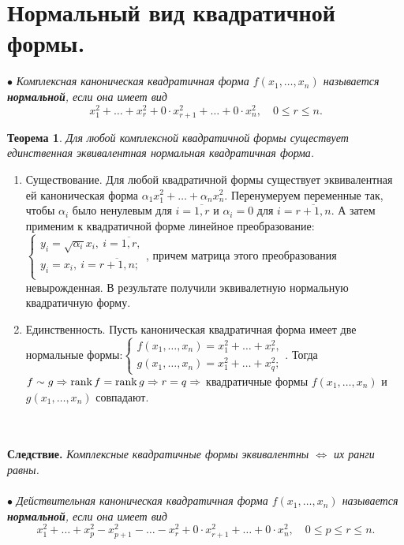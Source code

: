 \section{Нормальный вид квадратичной формы.}
$\bullet$ \textit{Комплексная каноническая квадратичная форма $f(x_1,\dots,x_n)$ называется \textbf{нормальной}, если она имеет вид}
$$x_1^2+ \ldots +x_r^2+0\cdot x_{r+1}^2+ \ldots +0\cdot x_n^2,\quad 0\leqslant r\leqslant n.$$
\newtheorem*{th13_4_1}{Теорема}\begin{th13_4_1}Для любой комплексной квадратичной формы существует единственная эквивалентная нормальная квадратичная форма.
\end{th13_4_1}\begin{Proof}\begin{enumerate}
		\item Существование. Для любой квадратичной формы существует эквивалентная ей каноническая форма $\alpha_1 x_1^2+ \ldots +\alpha_n x_n^2$. Перенумеруем переменные так, чтобы $\alpha_i$ было ненулевым для $i=\overline{1,r}$ и $\alpha_i=0$ для $i=\overline{r+1,n}$. А затем применим к квадратичной форме линейное преобразование: $\begin{cases}
			y_i=\sqrt{\alpha_i} x_i,\ i=\overline{1,r},\\
			y_i=x_i,\ i=\overline{r+1,n};\\
		\end{cases}$, причем матрица этого преобразования невырожденная. В результате получили эквивалетную нормальную квадратичную форму.
		\item Единственность. Пусть каноническая квадратичная форма имеет две нормальные формы:$\begin{cases}
			f(x_1,\dots,x_n)=x_1^2+ \ldots +x_r^2,\\
			g(x_1,\dots,x_n)=x_1^2+ \ldots +x_q^2;
		\end{cases}$. Тогда $f \sim g \Rightarrow \operatorname{rank} f=\operatorname{rank} g\Rightarrow r=q \Rightarrow$ квадратичные формы $f(x_1,\dots,x_n)$ и $g(x_1,\dots,x_n)$ совпадают.
	\end{enumerate}
\end{Proof}\\\\
\textbf{Следствие.} \textit{Комплексные квадратичные формы эквивалентны $\Longleftrightarrow$ их ранги равны.}\\\\
$\bullet$ \textit{Действительная каноническая квадратичная форма $f(x_1,\dots,x_n)$ называется \textbf{нормальной}, если она имеет вид}
$$x_1^2+ \ldots +x_p^2-x_{p+1}^2-\ldots-x_r^2+0 \cdot x_{r+1}^2+ \ldots +0 \cdot x_n^2,\quad 0\leqslant p\leqslant r\leqslant n.$$
